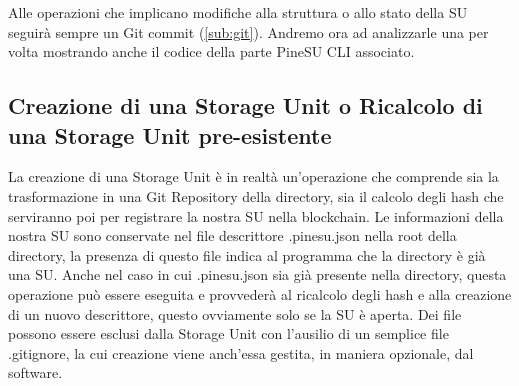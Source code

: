 Alle operazioni che implicano modifiche alla struttura o allo stato della SU seguirà sempre un Git \textsf{commit} (\autoref{sub:git}).
Andremo ora ad analizzarle una per volta mostrando anche il codice della parte PineSU CLI associato.

\subsection{Creazione di una Storage Unit o Ricalcolo di una Storage Unit pre-esistente}
La creazione di una Storage Unit è in realtà un'operazione che comprende sia la trasformazione in una Git Repository della directory, sia il calcolo degli hash che serviranno poi per registrare la nostra SU nella blockchain. Le informazioni della nostra SU sono conservate nel file descrittore \textsf{.pinesu.json} nella root della directory, la presenza di questo file indica al programma che la directory è già una SU. Anche nel caso in cui .pinesu.json sia già presente nella directory, questa operazione può essere eseguita e provvederà al ricalcolo degli hash e alla creazione di un nuovo descrittore, questo ovviamente solo se la SU è aperta.
Dei file possono essere esclusi dalla Storage Unit con l'ausilio di un semplice file \textsf{.gitignore}, la cui creazione viene anch'essa gestita, in maniera opzionale, dal software.


